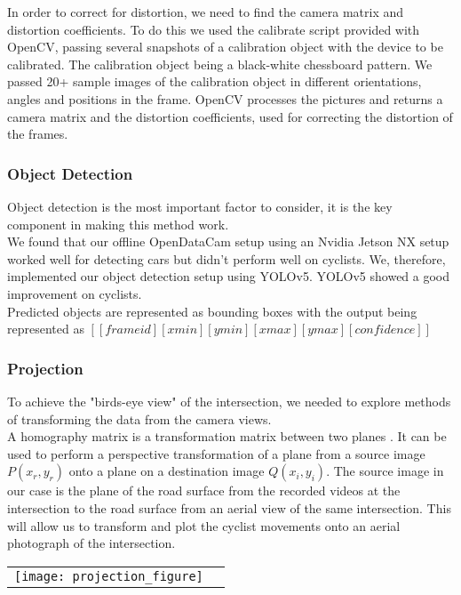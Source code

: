 In order to correct for distortion, we need to find the camera matrix and distortion coefficients. To do this we used the calibrate script provided with OpenCV,
passing several snapshots of a calibration object with the device to be calibrated. The calibration object being a black-white chessboard pattern.
We passed 20+ sample images of the calibration object in different orientations, angles and positions in the frame. OpenCV processes the pictures and
returns a camera matrix and the distortion coefficients, used for correcting the distortion of the frames.
\ \\

\subsubsection{Object Detection}
Object detection is the most important factor to consider, it is the key component in making this method work.
\ \\

We found that our offline OpenDataCam setup using an Nvidia Jetson NX setup worked well for detecting cars but didn't perform well on cyclists. 
We, therefore, implemented our object detection setup using
YOLOv5. YOLOv5 showed a good improvement on cyclists.
\ \\ 
Predicted objects are represented as bounding boxes with the output being represented as $[[frame id][xmin][ymin][xmax][ymax][confidence]]$

\subsubsection{Projection}
To achieve the "birds-eye view" of the intersection, we needed to explore methods of 
transforming the data from the camera views.  
\ \\
A homography matrix is a transformation matrix between two planes \cite{hartley_zisserman_2004}. It 
can be used to perform a perspective transformation of a plane from a source image $P(x_r, y_r)$ onto 
a plane on a destination image $Q(x_i, y_i)$.
The source image in our case is the plane of the road surface from the recorded videos at the intersection 
to the road surface from an aerial view of the same intersection. 
This will allow us to transform and plot the cyclist movements onto an aerial photograph of the intersection.
\ \\ 

\noindent
\begin{tabular}{@{}cc}
\texttt{[image: projection\_figure]} 
\end{tabular}
\label{projection_figure}
\

